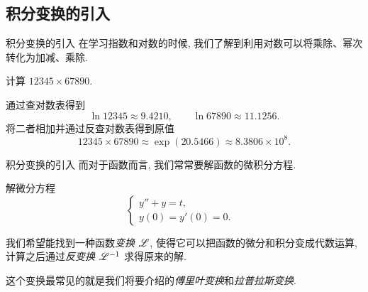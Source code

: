 \subsection{积分变换的引入}
\begin{frame}{积分变换的引入}
\onslide<+->
在学习指数和对数的时候, 我们了解到利用对数可以将乘除、幂次转化为加减、乘除.
\begin{example}
计算 $12345\times 67890$.
\end{example}
\begin{solution}
通过查对数表得到
\[\ln 12345\approx 9.4210,\qquad\ln 67890\approx 11.1256.\]
\onslide<+->
将二者相加并通过反查对数表得到原值
\[12345\times 67890\approx \exp(20.5466)\approx 8.3806\times 10^8.\]
\end{solution}
\end{frame}


\begin{frame}{积分变换的引入}
\onslide<+->
而对于函数而言, 我们常常要解函数的微积分方程.
\begin{example}
解微分方程
	\[\begin{cases}
		y''+y=t	,& \\
		y(0)=y'(0)=0.&
	\end{cases}\]
\end{example}
\begin{solution}
\indent
我们希望能找到一种函数\emph{变换 $\mathscr{L}$}, 使得它可以把函数的微分和积分变成代数运算, 计算之后通过\emph{反变换 $\mathscr{L}^{-1}$} 求得原来的解.

\indent
\onslide<+->
这个变换最常见的就是我们将要介绍的\emph{傅里叶变换}和\emph{拉普拉斯变换}.
\end{solution}
\end{frame}

